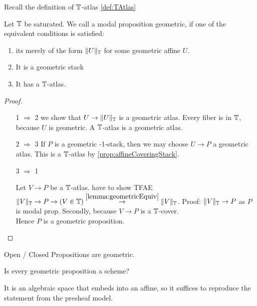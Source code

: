 Recall the definition of $\mathbb{T}$-atlas \ref{def:TAtlas}
\begin{definition}{\label{def:algprop}}
	Let $\mathbb{T}$ be saturated. We call a modal proposition geometric, if one of the equivalent conditions is satisfied:
	\begin{enumerate}
		\item  its merely of the form $\|U\|_{\mathbb{T}}$ for some geometric affine $U$.
		\item It is a geometric stack
		\item It has a $\mathbb{T}$-atlas.

	\end{enumerate}
	
\end{definition}
\begin{proof} \
	\begin{enumerate}
		\item [1 $\Rightarrow$ 2]
		we show that $U \to \|U\|_{\mathbb{T}}$ is a geometric atlas. Every fiber is in $\mathbb{T}$, because $U$ is geometric. A $\mathbb{T}$-atlas is a geometric atlas.
		\item [2 $\Rightarrow$ 3]
		If $P$ is a geometric -1-stack, then we may choose $U \to P$ a geometric atlas. This is a $\mathbb{T}$-atlas by \ref{prop:affineCoveringStack}.

		\item [3 $\Rightarrow$ 1]
		
		Let $V \to P$ be a $\mathbb{T}$-atlas.
		have to show TFAE $\|V\|_{\mathbb{T}} \to P \to (V \in \mathbb{T}) \overset{\ref{lemma:geometricEquiv}}{\to} \|V\|_{\mathbb{T}}$. 
		Proof: $\|V\|_{\mathbb{T}} \to P$ as $P$ is modal prop. Secondly, because $V \to P$ is a $\mathbb{T}$-cover. \\
		Hence $P$ is a geometric proposition.
	\end{enumerate}
	
\end{proof}
\begin{example}
	Open / Closed Propositions are geometric.
\end{example}
\begin{question}
Is every geometric proposition a scheme?
\end{question}
It is an algebraic space that embeds into an affine, so it suffices to reproduce the statement from the presheaf model.

